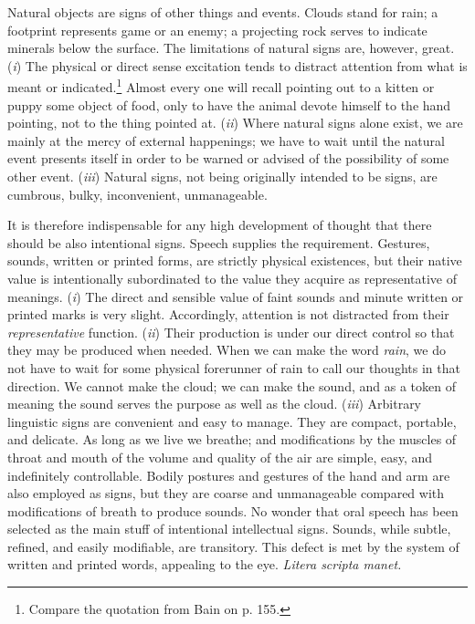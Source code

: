 \documentclass[letterpaper]{book}
\begin{document}

Natural objects are signs of other things and events. Clouds stand for
rain; a footprint represents game or an enemy; a projecting rock serves
to indicate minerals below the surface. The limitations of natural signs
are, however, great. (\emph{i}) The physical or direct sense excitation
tends to distract attention from what is meant or
indicated.\footnote{ Compare the quotation from Bain on p. 155. }
Almost every one will recall pointing out to a kitten or puppy some
object of food, only to have the animal devote himself to the hand
pointing, not to the thing pointed at. (\emph{ii}) Where natural signs
alone exist, we are mainly at the mercy of external happenings;
we
have to wait until the natural event presents itself in order to be
warned or advised of the possibility of some other event. (\emph{iii})
Natural signs, not being originally intended to be signs, are cumbrous,
bulky, inconvenient, unmanageable.


It is therefore indispensable for any high development of thought that
there should be also intentional signs. Speech supplies the requirement.
Gestures, sounds, written or printed forms, are strictly physical
existences, but their native value is intentionally subordinated to the
value they acquire as representative of meanings. (\emph{i}) The direct
and sensible value of faint sounds and minute written or printed marks
is very slight. Accordingly, attention is not distracted from their
\emph{representative} function. (\emph{ii}) Their production is under
our direct control so that they may be produced when needed. When we can
make the word \emph{rain}, we do not have to wait for some physical
forerunner of rain to call our thoughts in that direction. We cannot
make the cloud; we can make the sound, and as a token of meaning the
sound serves the purpose as well as the cloud. (\emph{iii}) Arbitrary
linguistic signs are convenient and easy to manage. They are compact,
portable, and delicate. As long as we live we breathe; and modifications
by the muscles of throat and mouth of the volume and quality of the air
are simple, easy, and indefinitely controllable. Bodily postures and
gestures of the hand and arm are also employed as signs, but they are
coarse and unmanageable compared with modifications of breath to produce
sounds. No wonder that oral speech has been selected as the main stuff
of intentional intellectual signs. Sounds, while subtle, refined, and
easily modifiable, are transitory. This defect is met by the system of
written
and printed words, appealing to the eye. \emph{Litera scripta manet.}
\end{document}
